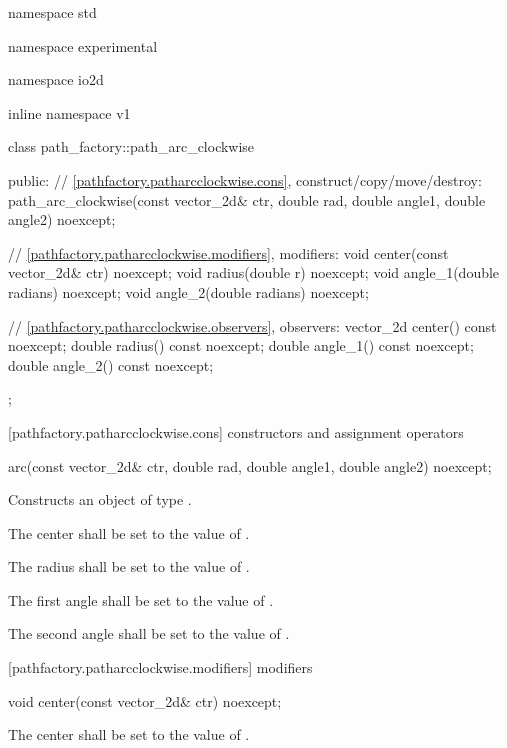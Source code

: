 \begin{codeblock}
namespace std { namespace experimental { namespace io2d { inline namespace v1 {
  class path_factory::path_arc_clockwise {
  public:
    // \ref{pathfactory.patharcclockwise.cons}, construct/copy/move/destroy:
    path_arc_clockwise(const vector_2d& ctr, double rad, double angle1, double angle2) noexcept;

    // \ref{pathfactory.patharcclockwise.modifiers}, modifiers:
    void center(const vector_2d& ctr) noexcept;
    void radius(double r) noexcept;
    void angle_1(double radians) noexcept;
    void angle_2(double radians) noexcept;

    // \ref{pathfactory.patharcclockwise.observers}, observers:
    vector_2d center() const noexcept;
    double radius() const noexcept;
    double angle_1() const noexcept;
    double angle_2() const noexcept;
  };
} } } }
\end{codeblock}

 [pathfactory.patharcclockwise.cons] { constructors and assignment operators}

\begin{itemdecl}
    arc(const vector_2d& ctr, double rad, double angle1, double angle2) noexcept;
\end{itemdecl}
\begin{itemdescr}
	\pnum
	\effects
	Constructs an object of type .
	
	\pnum
	The center shall be set to the value of .
	
	\pnum
	The radius shall be set to the value of .
	
	\pnum
	The first angle shall be set to the value of .
	
	\pnum
	The second angle shall be set to the value of .
\end{itemdescr}

 [pathfactory.patharcclockwise.modifiers]{ modifiers}

\begin{itemdecl}
    void center(const vector_2d& ctr) noexcept;
\end{itemdecl}
\begin{itemdescr}
	\pnum
	\effects
	The center shall be set to the value of .
\end{itemdescr}

